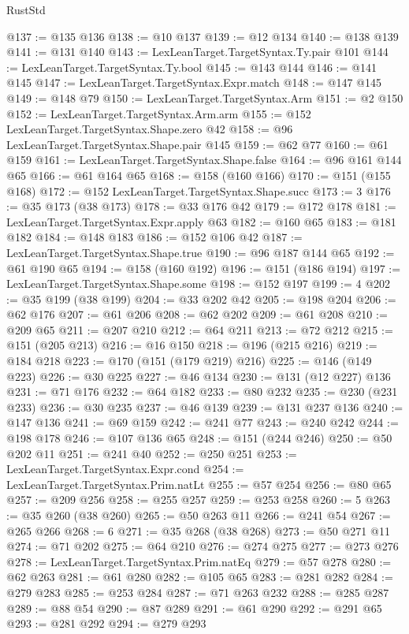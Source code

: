 \begin{lexlean}{RustStd}
\begin{coremodule}
@137 := @135 @136
@138 := @10 @137
@139 := @12 @134
@140 := @138 @139
@141 := @131 @140
@143 := LexLeanTarget.TargetSyntax.Ty.pair @101
@144 := LexLeanTarget.TargetSyntax.Ty.bool
@145 := @143 @144
@146 := @141 @145
@147 := LexLeanTarget.TargetSyntax.Expr.match
@148 := @147 @145
@149 := @148 @79
@150 := LexLeanTarget.TargetSyntax.Arm
@151 := @2 @150
@152 := LexLeanTarget.TargetSyntax.Arm.arm
@155 := @152 LexLeanTarget.TargetSyntax.Shape.zero @42
@158 := @96 LexLeanTarget.TargetSyntax.Shape.pair @145
@159 := @62 @77
@160 := @61 @159
@161 := LexLeanTarget.TargetSyntax.Shape.false
@164 := @96 @161 @144 @65
@166 := @61 @164 @65
@168 := @158 (@160 @166)
@170 := @151 (@155 @168)
@172 := @152 LexLeanTarget.TargetSyntax.Shape.succ
@173 := 3
@176 := @35 @173 (@38 @173)
@178 := @33 @176 @42
@179 := @172 @178
@181 := LexLeanTarget.TargetSyntax.Expr.apply @63
@182 := @160 @65
@183 := @181 @182
@184 := @148 @183
@186 := @152 @106 @42
@187 := LexLeanTarget.TargetSyntax.Shape.true
@190 := @96 @187 @144 @65
@192 := @61 @190 @65
@194 := @158 (@160 @192)
@196 := @151 (@186 @194)
@197 := LexLeanTarget.TargetSyntax.Shape.some
@198 := @152 @197
@199 := 4
@202 := @35 @199 (@38 @199)
@204 := @33 @202 @42
@205 := @198 @204
@206 := @62 @176
@207 := @61 @206
@208 := @62 @202
@209 := @61 @208
@210 := @209 @65
@211 := @207 @210
@212 := @64 @211
@213 := @72 @212
@215 := @151 (@205 @213)
@216 := @16 @150
@218 := @196 (@215 @216)
@219 := @184 @218
@223 := @170 (@151 (@179 @219) @216)
@225 := @146 (@149 @223)
@226 := @30 @225
@227 := @46 @134
@230 := @131 (@12 @227) @136
@231 := @71 @176
@232 := @64 @182
@233 := @80 @232
@235 := @230 (@231 @233)
@236 := @30 @235
@237 := @46 @139
@239 := @131 @237 @136
@240 := @147 @136
@241 := @69 @159
@242 := @241 @77
@243 := @240 @242
@244 := @198 @178
@246 := @107 @136 @65
@248 := @151 (@244 @246)
@250 := @50 @202 @11
@251 := @241 @40
@252 := @250 @251
@253 := LexLeanTarget.TargetSyntax.Expr.cond
@254 := LexLeanTarget.TargetSyntax.Prim.natLt
@255 := @57 @254
@256 := @80 @65
@257 := @209 @256
@258 := @255 @257
@259 := @253 @258
@260 := 5
@263 := @35 @260 (@38 @260)
@265 := @50 @263 @11
@266 := @241 @54
@267 := @265 @266
@268 := 6
@271 := @35 @268 (@38 @268)
@273 := @50 @271 @11
@274 := @71 @202
@275 := @64 @210
@276 := @274 @275
@277 := @273 @276
@278 := LexLeanTarget.TargetSyntax.Prim.natEq
@279 := @57 @278
@280 := @62 @263
@281 := @61 @280
@282 := @105 @65
@283 := @281 @282
@284 := @279 @283
@285 := @253 @284
@287 := @71 @263 @232
@288 := @285 @287
@289 := @88 @54
@290 := @87 @289
@291 := @61 @290
@292 := @291 @65
@293 := @281 @292
@294 := @279 @293

\end{coremodule}
\end{lexlean}

